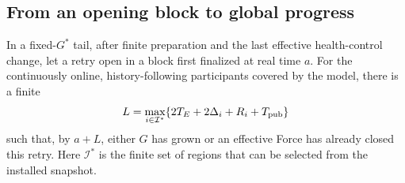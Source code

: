 \subsection{From an opening block to global progress}
\label{sec:v35-global-progress}
\begin{proposition}
\label{prop:v35-public-response}
In a fixed-$G^*$ tail, after finite preparation and the last effective
health-control change, let a retry open in a block first finalized at
real time $a$. For the continuously online, history-following participants
covered by the model, there is a finite
\[
 L=\max_{i\in\mathcal I^*}
       \{2T_E+2\Delta_i+R_i+T_{\rm pub}\}
\]
such that, by $a+L$, either $G$ has grown or an effective Force has
already closed this retry. Here $\mathcal I^*$ is the finite set of
regions that can be selected from the installed snapshot.
\end{proposition}
